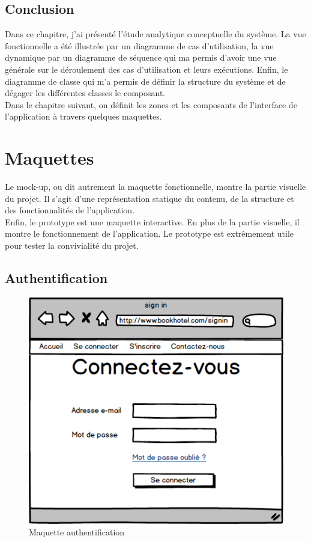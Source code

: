 \documentclass[12pt,a4paper]{report}
\begin{document}
		\section{Conclusion}
Dans ce chapitre, j'ai présenté l'étude analytique conceptuelle du système. La vue fonctionnelle a été illustrée par un diagramme de cas d’utilisation, la vue dynamique par un diagramme de séquence qui ma permis d'avoir une vue générale sur le déroulement des cas d'utilisation et leurs exécutions. Enfin, le diagramme de classe qui m'a permis de définir la structure du système et de dégager les différentes classes le composant.\\
Dans le chapitre suivant, on définit les zones et les composants de l’interface de l'application à travers quelques maquettes.	




	


	\chapter{Maquettes}
Le mock-up, ou dit autrement la maquette fonctionnelle, montre la partie visuelle
du projet. Il s’agit d’une représentation statique du contenu, de la structure
et des fonctionnalités de l’application.\\
Enfin, le prototype est une maquette interactive. En plus de la partie visuelle,
il montre le fonctionnement de l’application. Le prototype est extrêmement utile
pour tester la convivialité du projet.\\
	
	
	\section{Authentification}
	\begin{figure}[!hbtp]
		\centering
		\includegraphics[scale=0.5]{./graphics/1.png}
		\caption{Maquette authentification}
	\end{figure}
	
\end{document}
